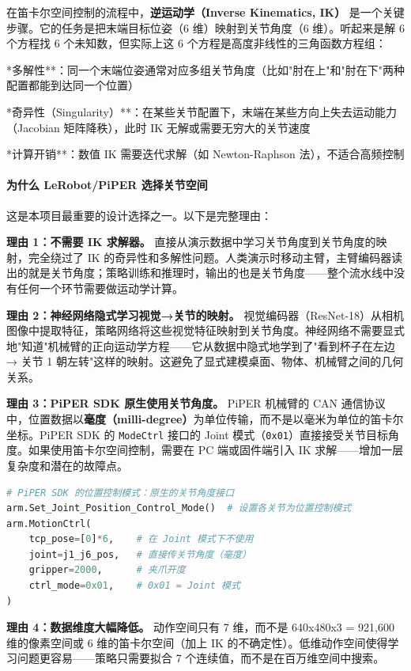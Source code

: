 \documentclass[UTF8,a4paper,11pt]{ctexart}
\begin{document}
在笛卡尔空间控制的流程中，\textbf{逆运动学（Inverse Kinematics, IK）} 是一个关键步骤。它的任务是把末端目标位姿（6 维）映射到关节角度（6 维）。听起来是解 6 个方程找 6 个未知数，但实际上这 6 个方程是高度非线性的三角函数方程组：

\item **多解性**：同一个末端位姿通常对应多组关节角度（比如"肘在上"和"肘在下"两种配置都能到达同一个位置）
\item **奇异性（Singularity）**：在某些关节配置下，末端在某些方向上失去运动能力（Jacobian 矩阵降秩），此时 IK 无解或需要无穷大的关节速度
\item **计算开销**：数值 IK 需要迭代求解（如 Newton-Raphson 法），不适合高频控制

\paragraph{为什么 LeRobot/PiPER 选择关节空间}


这是本项目最重要的设计选择之一。以下是完整理由：

\textbf{理由 1：不需要 IK 求解器。} 直接从演示数据中学习关节角度到关节角度的映射，完全绕过了 IK 的奇异性和多解性问题。人类演示时移动主臂，主臂编码器读出的就是关节角度；策略训练和推理时，输出的也是关节角度——整个流水线中没有任何一个环节需要做运动学计算。

\textbf{理由 2：神经网络隐式学习视觉→关节的映射。} 视觉编码器（ResNet-18）从相机图像中提取特征，策略网络将这些视觉特征映射到关节角度。神经网络不需要显式地"知道"机械臂的正向运动学方程——它从数据中隐式地学到了"看到杯子在左边 → 关节 1 朝左转"这样的映射。这避免了显式建模桌面、物体、机械臂之间的几何关系。

\textbf{理由 3：PiPER SDK 原生使用关节角度。} PiPER 机械臂的 CAN 通信协议中，位置数据以\textbf{毫度（milli-degree）}为单位传输，而不是以毫米为单位的笛卡尔坐标。PiPER SDK 的 \texttt{ModeCtrl} 接口的 Joint 模式（\texttt{0x01}）直接接受关节目标角度。如果使用笛卡尔空间控制，需要在 PC 端或固件端引入 IK 求解——增加一层复杂度和潜在的故障点。

\begin{lstlisting}[language=python]
# PiPER SDK 的位置控制模式：原生的关节角度接口
arm.Set_Joint_Position_Control_Mode()  # 设置各关节为位置控制模式
arm.MotionCtrl(
    tcp_pose=[0]*6,    # 在 Joint 模式下不使用
    joint=j1_j6_pos,   # 直接传关节角度（毫度）
    gripper=2000,      # 夹爪开度
    ctrl_mode=0x01,    # 0x01 = Joint 模式
)
\end{lstlisting}

\textbf{理由 4：数据维度大幅降低。} 动作空间只有 7 维，而不是 640x480x3 = 921,600 维的像素空间或 6 维的笛卡尔空间（加上 IK 的不确定性）。低维动作空间使得学习问题更容易——策略只需要拟合 7 个连续值，而不是在百万维空间中搜索。
\end{document}
